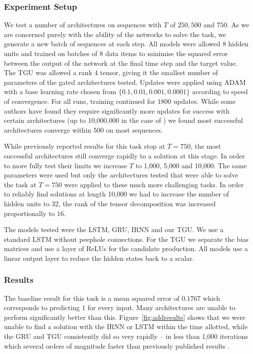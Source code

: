 \subsubsection{Experiment Setup}
We test a number of architectures on sequences with \(T\) of \(250, 500\) and \(750\). As we are
concerned purely with the ability of the networks to solve the task, we generate a new batch of
sequences at each step. All models were allowed \(8\) hidden units and trained on batches of \(8\)
data items to minimise the squared error between the output of the network at the final time step and
the target value. The TGU was allowed a rank \(4\) tensor, giving it the smallest number of parameters
of the gated architectures tested.
Updates were applied using ADAM \autocite{Kingma2014} with a base learning rate chosen
from \(\{0.1, 0.01, 0.001, 0.0001\}\) according to speed of convergence. For all runs, training continued
for \(1800\) updates. While some authors have found they require significantly more updates for success
with certain architectures (up to 10,000,000 in the case of \autocite{Le2015}) we found most successful
architectures converge within 500 on most sequences.

While previously reported results for this task stop at \(T=750\), the most successful architectures still
converge rapidly to a solution at this stage. In order to more fully test their limits we increase
\(T\) to 1,000, 5,000 and 10,000. The same parameters were used but only the architectures tested that
were able to solve the task at \(T=750\) were applied to these much more challenging tasks. In order
to reliably find solutions at length 10,000 we had to increase the number of hidden units to \(32\), the
rank of the tensor decomposition was increased proportionally to \(16\).

The models tested were the LSTM, GRU, IRNN \autocite{Le2015} and our TGU. We use a standard LSTM without
peephole connections. For the TGU we separate the bias matrices and use a layer of ReLUs for the candidate
production. All models use a linear output layer to reduce the hidden states back to a scalar.

\subsubsection{Results}
The baseline result for this task is a mean squared error of \(0.1767\) which corresponds to predicting
\(1\) for every input. Many architectures are unable to perform significantly better than this.
Figure~\ref{fig:addresults} shows that we were unable to find a solution with the IRNN or LSTM within
the time allotted, while the GRU and TGU consistently did so very rapidly -- in less than 1,000
iterations which several orders of magnitude faster than previously published results 
\autocite{Le2015, Arjovsky2015, Henaff2016}.

